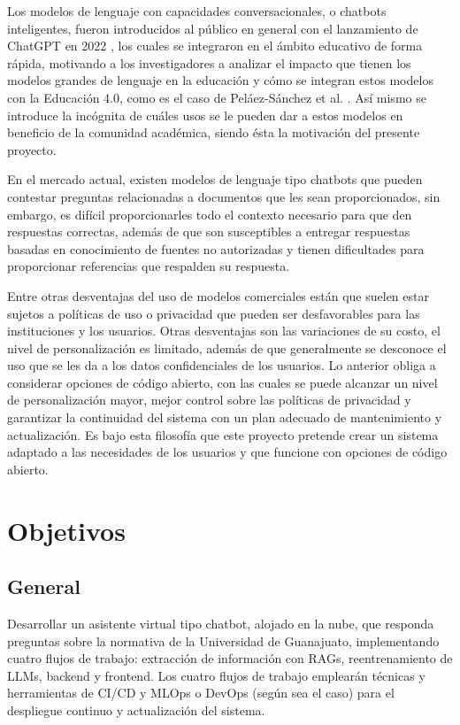 Los modelos de lenguaje con capacidades conversacionales, o chatbots inteligentes,
fueron introducidos al público en general con el lanzamiento de ChatGPT en
2022 \cite{openai_introducing_2022}, los cuales se integraron en el ámbito educativo de
forma rápida, motivando a los investigadores a analizar el impacto que tienen los modelos
grandes de lenguaje en la educación y cómo se integran estos modelos con la
Educación 4.0, como es el caso de Peláez-Sánchez et al. \cite{pelaez-sanchez_impact_2024}.
Así mismo se introduce la incógnita de cuáles usos se le pueden dar a estos modelos en
beneficio de la comunidad académica, siendo ésta la motivación del presente proyecto.

En el mercado actual, existen modelos de lenguaje tipo chatbots que pueden
contestar preguntas relacionadas a documentos que les sean proporcionados,
sin embargo, es difícil proporcionarles todo el contexto necesario para que den
respuestas correctas, además de que son susceptibles a entregar respuestas basadas
en conocimiento de fuentes no autorizadas y tienen dificultades para proporcionar
referencias que respalden su respuesta.

Entre otras desventajas del uso de modelos comerciales están que suelen estar
sujetos a políticas de uso o privacidad que pueden ser desfavorables para las
instituciones y los usuarios. Otras desventajas son las variaciones de su costo,
el nivel de personalización es limitado, además de que generalmente se desconoce
el uso que se les da a los datos confidenciales de los usuarios. Lo anterior
obliga a considerar opciones de código abierto, con las cuales se puede alcanzar
un nivel de personalización mayor, mejor control sobre las políticas de privacidad
y garantizar la continuidad del sistema con un plan adecuado de mantenimiento
y actualización. Es bajo esta filosofía que este proyecto pretende crear un sistema
adaptado a las necesidades de los usuarios y que funcione con opciones de código
abierto.

\section{Objetivos}

\subsection{General}

Desarrollar un asistente virtual tipo chatbot, alojado en la nube, que responda
preguntas sobre la normativa de la Universidad de Guanajuato, implementando cuatro
flujos de trabajo: extracción de información con RAGs, reentrenamiento de LLMs,
backend y frontend. Los cuatro flujos de trabajo emplearán técnicas y herramientas
de CI/CD y MLOps o DevOps (según sea el caso) para el despliegue continuo y
actualización del sistema.

